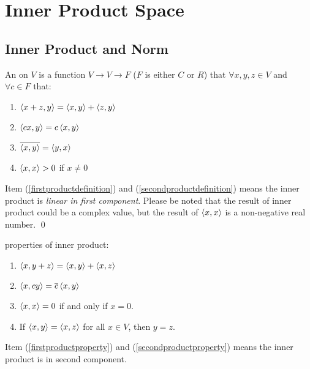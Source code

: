 \section{Inner Product Space}


\subsection{Inner Product and Norm}

\begin{definition}
	An  on $V$ is a function $V \rightarrow V \rightarrow F$ ($F$ is either $C$ or $R$) that $\forall x,y,z \in V$ and $\forall c \in F$ that:
	\begin{enumerate}
		\item $\left\langle \displaystyle x+z, y \right\rangle = \left\langle \displaystyle x, y \right\rangle + \left\langle \displaystyle z, y \right\rangle$ \label{firstproductdefinition}
		\item $\left\langle \displaystyle cx, y \right\rangle = c \left\langle \displaystyle x, y \right\rangle$ \label{secondproductdefinition}
		\item $\overline{\left\langle \displaystyle x, y \right\rangle} = \left\langle \displaystyle y, x \right\rangle$
		\item $\left\langle \displaystyle x, x \right\rangle > 0$ if $x \neq 0$
	\end{enumerate}
	Item (\ref{firstproductdefinition}) and (\ref{secondproductdefinition}) means the inner product is \emph{linear in first component}.
	Please be noted that the result of inner product could be a complex value, but the result of $\left\langle \displaystyle x, x \right\rangle$ is a non-negative real number.
	\qed
\end{definition}


\begin{theorem}
	properties of inner product:
	\begin{enumerate}
		\item $\left\langle \displaystyle x, y+z \right\rangle = \left\langle \displaystyle x, y \right\rangle + \left\langle \displaystyle x, z \right\rangle$ \label{firstproductproperty}
		\item $\left\langle \displaystyle x, cy \right\rangle = \overline{c} \left\langle \displaystyle x, y \right\rangle $ \label{secondproductproperty}
		\item $\left\langle \displaystyle x, x \right\rangle = 0$ if and only if $x = 0$.
		\item If $\left\langle \displaystyle x, y \right\rangle = \left\langle \displaystyle x, z \right\rangle$ for all $x \in V$, then $y=z$.
	\end{enumerate}
	Item (\ref{firstproductproperty}) and (\ref{secondproductproperty}) means the inner product is  in second component.
\end{theorem}



